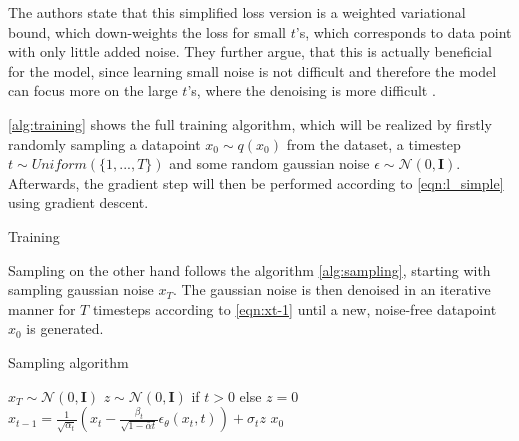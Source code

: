 The authors \cite{ho2020DenoisingDiffusionProbabilistic} state that this simplified loss version is a weighted variational bound, which down-weights the loss for small $t$'s, which corresponds to data point with only little added noise.
They further argue, that this is actually beneficial for the model, since learning small noise is not difficult and therefore the model can focus more on the large $t$'s, where the denoising is more difficult \cite{ho2020DenoisingDiffusionProbabilistic}.

\autoref{alg:training} shows the full training algorithm, which will be realized by firstly randomly sampling a datapoint $x_0 \sim q(x_0)$ from the dataset, a timestep $t\sim Uniform(\{1, ..., T\})$ and some random gaussian noise $\epsilon \sim \mathcal{N}(0, \textbf{I})$.
Afterwards, the gradient step will then be performed according to \autoref{eqn:l_simple} using gradient descent.

\begin{algorithm}
  \caption[Training]{Training \cite[p. 4]{ho2020DenoisingDiffusionProbabilistic}}
  \label{alg:training}
\end{algorithm}


Sampling on the other hand follows the algorithm \autoref{alg:sampling}, starting with sampling gaussian noise $x_T$.
The gaussian noise is then denoised in an iterative manner for $T$ timesteps according to \autoref{eqn:xt-1} until a new, noise-free datapoint $x_0$ is generated.

\begin{algorithm}
\caption[Sampling algorithm]{Sampling algorithm \cite[p. 4]{ho2020DenoisingDiffusionProbabilistic}}
  \label{alg:sampling}
  \begin{algorithmic}
  \State $x_T \sim \mathcal{N}(0, \mathbf{I})$
  \State $z \sim \mathcal{N}(0, \mathbf{I})$ if $t > 0$ else $z = 0$
  \State $x_{t-1} = \frac{1}{\sqrt{\alpha_t}}\left(x_t - \frac{\beta_t}{\sqrt{1-\bar{\alpha}t}}\epsilon_{\theta}(x_t,t)\right) + \sigma_t z$
  \EndFor
  \State \Return $x_0$
  \end{algorithmic}
\end{algorithm}

